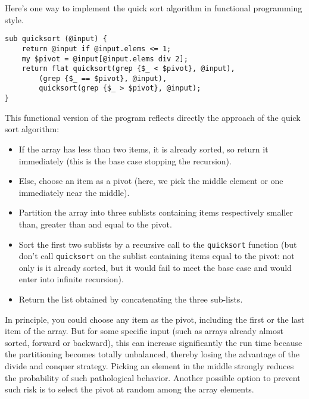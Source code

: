 Here's one way to implement the quick sort algorithm in 
functional programming style.

\begin{verbatim}
sub quicksort (@input) {
    return @input if @input.elems <= 1;
    my $pivot = @input[@input.elems div 2];
    return flat quicksort(grep {$_ < $pivot}, @input), 
        (grep {$_ == $pivot}, @input), 
        quicksort(grep {$_ > $pivot}, @input);
}
\end{verbatim}

This functional version of the program reflects directly 
the approach of the quick sort algorithm:
\begin{itemize}
\item If the  array has less than two items, it is already 
sorted, so return it immediately (this is the base case 
stopping the recursion).
\item Else, choose an item as a pivot (here, we pick the 
middle element or one immediately near the middle).
\item Partition the array into three sublists containing 
items respectively smaller than, greater than and equal to 
the pivot.
\item Sort the first two sublists by a recursive call to 
the \verb'quicksort' function (but don't call \verb'quicksort' 
on the sublist containing items equal to the pivot: not only is 
it already sorted, but it would fail to meet the base 
case and would enter into infinite recursion).
\item  Return the list obtained by concatenating the three 
sub-lists.
\end{itemize}

In principle, you could choose any item as the pivot, including 
the first or the last item of the array. But for 
some specific input (such as arrays already almost sorted, 
forward or backward), this can increase significantly the 
run time because the partitioning becomes totally unbalanced, 
thereby losing the advantage of the divide and conquer strategy. 
Picking an element in the middle strongly reduces the 
probability of such pathological behavior. Another possible option 
to prevent such risk is to select the pivot at random among 
the array elements.


